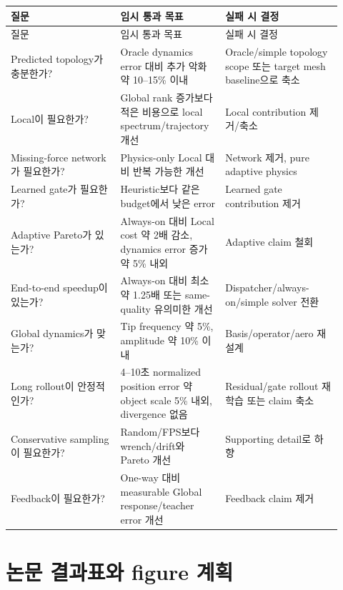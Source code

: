 \documentclass[11pt,a4paper]{article}
\begin{document}
\begin{longtable}{L{0.31\linewidth}L{0.28\linewidth}L{0.33\linewidth}}
\toprule
질문 & 임시 통과 목표 & 실패 시 결정 \\
\midrule
\endfirsthead
\toprule
질문 & 임시 통과 목표 & 실패 시 결정 \\
\midrule
\endhead
Predicted topology가 충분한가? & Oracle dynamics error 대비 추가 악화 약 10--15\% 이내 & Oracle/simple topology scope 또는 target mesh baseline으로 축소 \\
\addlinespace
Local이 필요한가? & Global rank 증가보다 적은 비용으로 local spectrum/trajectory 개선 & Local contribution 제거/축소 \\
\addlinespace
Missing-force network가 필요한가? & Physics-only Local 대비 반복 가능한 개선 & Network 제거, pure adaptive physics \\
\addlinespace
Learned gate가 필요한가? & Heuristic보다 같은 budget에서 낮은 error & Learned gate contribution 제거 \\
\addlinespace
Adaptive Pareto가 있는가? & Always-on 대비 Local cost 약 2배 감소, dynamics error 증가 약 5\% 내외 & Adaptive claim 철회 \\
\addlinespace
End-to-end speedup이 있는가? & Always-on 대비 최소 약 1.25배 또는 same-quality 유의미한 개선 & Dispatcher/always-on/simple solver 전환 \\
\addlinespace
Global dynamics가 맞는가? & Tip frequency 약 5\%, amplitude 약 10\% 이내 & Basis/operator/aero 재설계 \\
\addlinespace
Long rollout이 안정적인가? & 4--10초 normalized position error 약 object scale 5\% 내외, divergence 없음 & Residual/gate rollout 재학습 또는 claim 축소 \\
\addlinespace
Conservative sampling이 필요한가? & Random/FPS보다 wrench/drift와 Pareto 개선 & Supporting detail로 하향 \\
\addlinespace
Feedback이 필요한가? & One-way 대비 measurable Global response/teacher error 개선 & Feedback claim 제거 \\
\bottomrule
\end{longtable}

\section{논문 결과표와 figure 계획}
\end{document}
